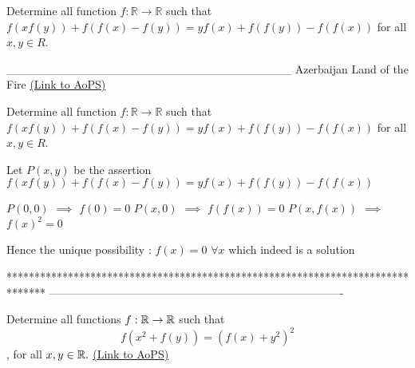 \begin{problem}
	Determine all function $f: \mathbb{R}\to\mathbb{R}$ such that $f(xf(y))+f(f(x)-f(y))=yf(x)+f(f(y))-f(f(x))$
for all $x,y{\in}R$.

__________________________________
Azerbaijan Land of the Fire 
	\flushright \href{https://artofproblemsolving.com/community/c6h530203}{(Link to AoPS)}
\end{problem}



\begin{solution}
	\begin{tcolorbox}Determine all function $f: \mathbb{R}\to\mathbb{R}$ such that $f(xf(y))+f(f(x)-f(y))=yf(x)+f(f(y))-f(f(x))$
for all $x,y{\in}R$.\end{tcolorbox}
Let $P(x,y)$ be the assertion $f(xf(y))+f(f(x)-f(y))=yf(x)+f(f(y))-f(f(x))$

$P(0,0)$ $\implies$ $f(0)=0$
$P(x,0)$ $\implies$ $f(f(x))=0$
$P(x,f(x))$ $\implies$ $f(x)^2=0$

Hence the unique possibility : $\boxed{f(x)=0}$ $\forall x$ which indeed is a solution
\end{solution}
*******************************************************************************
-------------------------------------------------------------------------------

\begin{problem}
	Determine all functions $f:\Bbb{R}\to\Bbb{R}$ such that \[  f(x^2 + f(y)) = (f(x) + y^2)^ 2 \] , for all $x,y\in \Bbb{R}.$
	\flushright \href{https://artofproblemsolving.com/community/c6h530289}{(Link to AoPS)}
\end{problem}




